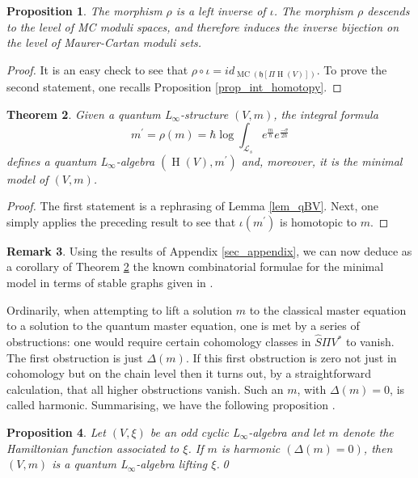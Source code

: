 \documentclass[]{amsart}
\newtheorem{theorem}{Theorem}[section]
\newtheorem{proposition}[theorem]{Proposition}
\theoremstyle{definition}
\newtheorem{remark}[theorem]{Remark}
\newcommand{\Linf}{L$_\infty$}
\newcommand{\MC}{\operatorname{MC}}
\newcommand{\homology}{\operatorname{H}}
\begin{document}
\begin{proposition}
The morphism $\rho$ is a left inverse of $\iota$. The morphism $\rho$ descends to the level of MC moduli spaces, and therefore induces the inverse bijection on the level of Maurer-Cartan moduli sets.
\end{proposition}
\begin{proof}
It is an easy check to see that $\rho \circ \iota =id_{\MC(\mathfrak{h}[\Pi \homology (V)])}$. To prove the second statement, one recalls Proposition \ref{prop_int_homotopy}.
\end{proof}

\begin{theorem}\label{thm_main}
Given a quantum \Linf-structure $(V,m)$, the integral formula
\[
m^\prime = \rho(m) = \hbar \log \int_{ \mathcal{L}_s} e^{\frac{m}{\hbar}}e^{\frac{-\sigma}{2\hbar}}
\]
defines a quantum \Linf-algebra $(\homology(V),m^\prime)$ and, moreover, it is the minimal model of $(V,m)$.
\end{theorem}
\begin{proof}
The first statement is a rephrasing of Lemma \ref{lem_qBV}. Next, one simply applies the preceding result to see that $\iota(m^\prime)$ is homotopic to $m$.
\end{proof}

\begin{remark}
Using the results of Appendix \ref{sec_appendix}, we can now deduce as a corollary of Theorem \ref{thm_main} the known combinatorial formulae for the minimal model in terms of stable graphs given in \cite{chuang_laz_feynman}.
\end{remark}

Ordinarily, when attempting to lift a solution $m$ to the classical master equation to a solution to the quantum master equation, one is met by a series of obstructions: one would require certain cohomology classes in $\hat{S}\Pi V^*$ to vanish. The first obstruction is just $\Delta(m)$. If this first obstruction is zero not just in cohomology but on the chain level then it turns out, by a straightforward calculation, that all higher obstructions vanish. Such an $m$, with $\Delta(m)=0$, is called harmonic. Summarising, we have the following proposition \cite{braun_laz_unimodular}.

\begin{proposition}
Let $(V,\xi)$ be an odd cyclic \Linf-algebra and let $m$ denote the Hamiltonian function associated to $\xi$. If $m$ is harmonic $(\Delta (m)=0)$, then $(V,m)$ is a quantum \Linf-algebra lifting $\xi$.\qed
\end{proposition}
\end{document}
